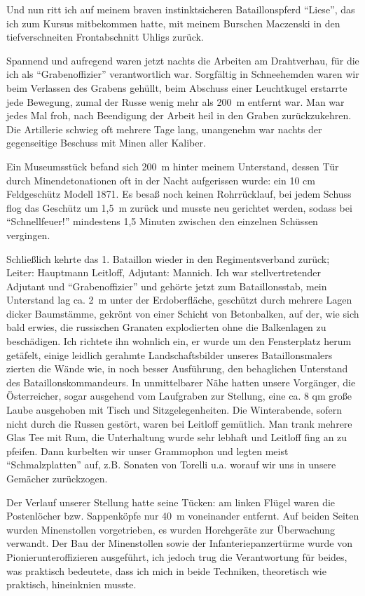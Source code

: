 \documentclass[a5paper,pagesize,10pt,twoside=true]{scrbook}
\renewcommand{\marginpar}[2][]{}
\begin{document}
Und nun ritt ich auf meinem braven instinktsicheren Bataillonspferd \enquote{Liese}, das ich zum Kursus mitbekommen hatte, mit meinem Burschen Maczenski in den tiefverschneiten Frontabschnitt Uhligs zurück.

Spannend und aufregend waren jetzt nachts die Arbeiten am Drahtverhau, für die ich als \enquote{Grabenoffizier} verantwortlich war. Sorgfältig in Schneehemden waren wir beim Verlassen des Grabens gehüllt, beim Abschuss einer Leuchtkugel erstarrte jede Bewegung, zumal der Russe wenig mehr als 200~m entfernt war. Man war jedes Mal froh, nach Beendigung der Arbeit heil in den Graben zurückzukehren. Die Artillerie schwieg oft mehrere Tage lang, unangenehm war nachts der gegenseitige Beschuss mit Minen aller Kaliber.

Ein Museumsstück befand sich 200~m hinter meinem Unterstand, dessen Tür durch Minendetonationen oft in der Nacht aufgerissen wurde: ein 10 cm Feldgeschütz Modell 1871. Es besaß noch keinen Rohrrücklauf, bei jedem Schuss flog das Geschütz um 1,5~m zurück und musste neu gerichtet werden, sodass bei \enquote{Schnellfeuer!} mindestens 1,5 Minuten zwischen den einzelnen Schüssen vergingen.

Schließlich kehrte das 1. Bataillon wieder in den Regimentsverband zurück; Leiter: Hauptmann Leitloff, Adjutant: Mannich. Ich war stellvertretender Adjutant und \enquote{Grabenoffizier} und gehörte jetzt zum Bataillonsstab, mein Unterstand lag ca. 2~m unter der Erdoberfläche, geschützt durch mehrere Lagen dicker Baumstämme, gekrönt von einer Schicht von Betonbalken, auf der, wie sich bald erwies, die russischen Granaten explodierten ohne die Balkenlagen zu beschädigen. Ich richtete ihn wohnlich ein, er wurde um den Fensterplatz herum getäfelt, einige leidlich gerahmte Landschaftsbilder unseres Bataillonsmalers zierten die Wände wie, in noch besser Ausführung, den behaglichen Unterstand des Bataillonskommandeurs. In unmittelbarer Nähe hatten unsere Vorgänger, die Österreicher, sogar ausgehend vom Laufgraben zur Stellung, eine ca. 8 qm große Laube ausgehoben mit Tisch und Sitzgelegenheiten. Die Winterabende, sofern nicht durch die Russen gestört, waren bei Leitloff gemütlich. Man trank mehrere Glas Tee mit Rum, die Unterhaltung wurde sehr lebhaft und Leitloff fing an zu pfeifen. Dann kurbelten wir unser Grammophon und legten meist \enquote{Schmalzplatten} auf, z.B. Sonaten von Torelli u.a. worauf wir uns in unsere Gemächer zurückzogen.

\marginpar{306}
Der Verlauf unserer Stellung hatte seine Tücken: am linken Flügel waren die Postenlöcher bzw. Sappenköpfe nur 40~m voneinander entfernt. Auf beiden Seiten wurden Minenstollen vorgetrieben, es wurden Horchgeräte zur Überwachung verwandt. Der Bau der Minenstollen sowie der Infanteriepanzertürme wurde von Pionierunteroffizieren ausgeführt, ich jedoch trug die Verantwortung für beides, was praktisch bedeutete, dass ich mich in beide Techniken, theoretisch wie praktisch, hineinknien musste.
\end{document}
